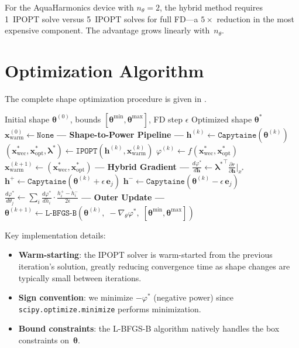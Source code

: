 \documentclass[11pt,a4paper]{article}
\newcommand{\vp}{\varphi}
\newcommand{\xwec}{\bm{x}_{\mathrm{wec}}}
\newcommand{\xopt}{\bm{x}_{\mathrm{opt}}}
\newcommand{\bh}{\bm{h}}
\newcommand{\blam}{\bm{\lambda}}
\newcommand{\btheta}{\bm{\theta}}
\newcommand{\pd}[2]{\frac{\partial #1}{\partial #2}}
\newcommand{\dd}[2]{\frac{d #1}{d #2}}
\begin{document}
For the AquaHarmonics device with $n_\theta = 2$, the hybrid method
requires 1~IPOPT solve versus 5~IPOPT solves for full FD---a
$5\times$ reduction in the most expensive component.  The advantage
grows linearly with~$n_\theta$.


\section{Optimization Algorithm}
\label{sec:algorithm}

The complete shape optimization procedure is given in
.

\begin{algorithm}[ht]
\caption{Gradient-based hull shape optimization}
\label{alg:shape_opt}
\begin{algorithmic}[1]
\Require Initial shape $\btheta^{(0)}$, bounds
         $[\btheta^{\min}, \btheta^{\max}]$, FD step $\epsilon$
\Ensure Optimized shape $\btheta^*$
\State $\bm{x}^{(0)}_{\mathrm{warm}} \gets \texttt{None}$
    \State \textbf{--- Shape-to-Power Pipeline ---}
    \State $\bh^{(k)} \gets \texttt{Capytaine}(\btheta^{(k)})$
    \State $(\xwec^*, \xopt^*, \blam^*) \gets
        \texttt{IPOPT}(\bh^{(k)}, \bm{x}^{(k)}_{\mathrm{warm}})$
    \State $\vp^{(k)} \gets f(\xwec^*, \xopt^*)$
    \State $\bm{x}^{(k+1)}_{\mathrm{warm}} \gets (\xwec^*, \xopt^*)$
    \State \textbf{--- Hybrid Gradient ---}
    \State $\dd{\vp^*}{\bh} \gets
        {\blam^*}^\top \pd{r}{\bh}\big|_{x^*}$
        \State $\bh^+ \gets \texttt{Capytaine}(\btheta^{(k)}
            + \epsilon\,\bm{e}_j)$
        \State $\bh^- \gets \texttt{Capytaine}(\btheta^{(k)}
            - \epsilon\,\bm{e}_j)$
        \State $\dd{\vp^*}{\theta_j} \gets
            \sum_i \dd{\vp^*}{h_i}
            \cdot \frac{h_i^+ - h_i^-}{2\epsilon}$
    \EndFor
    \State \textbf{--- Outer Update ---}
    \State $\btheta^{(k+1)} \gets
        \texttt{L-BFGS-B}\!\left(\btheta^{(k)},\;
        -\nabla_\theta \vp^*,\;
        [\btheta^{\min}, \btheta^{\max}]\right)$
\EndFor
\end{algorithmic}
\end{algorithm}

Key implementation details:
\begin{itemize}
    \item \textbf{Warm-starting}: the IPOPT solver is warm-started
          from the previous iteration's solution, greatly reducing
          convergence time as shape changes are typically small
          between iterations.
    \item \textbf{Sign convention}: we minimize $-\vp^*$ (negative
          power) since \texttt{scipy.optimize.minimize} performs
          minimization.
    \item \textbf{Bound constraints}: the L-BFGS-B algorithm
          natively handles the box constraints on~$\btheta$.
\end{itemize}
\end{document}

